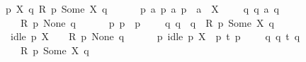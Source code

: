 \begin{isabellebody}
\isanewline
\ \ {\isacharparenleft}{\kern0pt}{\isasymforall}\ p\ X\ q{\isachardot}{\kern0pt}\ R\ p\ {\isacharparenleft}{\kern0pt}Some\ X{\isacharparenright}{\kern0pt}\ q\ {\isasymlongrightarrow}\isanewline
\ \ \ \ {\isacharparenleft}{\kern0pt}{\isasymforall}\ p{\isacharprime}{\kern0pt}\ a{\isachardot}{\kern0pt}\ p\ {\isasymlongmapsto}a\ p{\isacharprime}{\kern0pt}\ {\isasymand}\ a\ {\isasymin}\ X\ \ {\isasymlongrightarrow}\ \ {\isacharparenleft}{\kern0pt}{\isasymexists}\ q{\isacharprime}{\kern0pt}{\isachardot}{\kern0pt}\ {\isacharparenleft}{\kern0pt}q\ {\isasymlongmapsto}a\ q{\isacharprime}{\kern0pt}{\isacharparenright}{\kern0pt}\ {\isasymand}\ \isanewline
\ \ \ \ \ \ R\ p{\isacharprime}{\kern0pt}\ None\ q{\isacharprime}{\kern0pt}{\isacharparenright}{\kern0pt}{\isacharparenright}{\kern0pt}\ {\isasymand}\isanewline
\ \ \ \ {\isacharparenleft}{\kern0pt}{\isasymforall}\ p{\isacharprime}{\kern0pt}{\isachardot}{\kern0pt}\ p\ {\isasymlongmapsto}{\isasymtau}\ p{\isacharprime}{\kern0pt}\ \ {\isasymlongrightarrow}\ \ {\isacharparenleft}{\kern0pt}{\isasymexists}\ q{\isacharprime}{\kern0pt}{\isachardot}{\kern0pt}\ {\isacharparenleft}{\kern0pt}q\ {\isasymlongmapsto}{\isasymtau}\ q{\isacharprime}{\kern0pt}{\isacharparenright}{\kern0pt}\ {\isasymand}\ R\ p{\isacharprime}{\kern0pt}\ {\isacharparenleft}{\kern0pt}Some\ X{\isacharparenright}{\kern0pt}\ q{\isacharprime}{\kern0pt}{\isacharparenright}{\kern0pt}{\isacharparenright}{\kern0pt}\ {\isasymand}\isanewline
\ \ \ \ {\isacharparenleft}{\kern0pt}idle\ p\ X\ \ {\isasymlongrightarrow}\ \ R\ p\ None\ q{\isacharparenright}{\kern0pt}\ {\isasymand}\isanewline
\ \ \ \ {\isacharparenleft}{\kern0pt}{\isasymforall}\ p{\isacharprime}{\kern0pt}{\isachardot}{\kern0pt}\ idle\ p\ X\ {\isasymand}\ {\isacharparenleft}{\kern0pt}p\ {\isasymlongmapsto}t\ p{\isacharprime}{\kern0pt}{\isacharparenright}{\kern0pt}\ \ {\isasymlongrightarrow}\ \ {\isacharparenleft}{\kern0pt}{\isasymexists}\ q{\isacharprime}{\kern0pt}{\isachardot}{\kern0pt}\ q\ {\isasymlongmapsto}t\ q{\isacharprime}{\kern0pt}\ {\isasymand}\ \isanewline
\ \ \ \ \ \ R\ p{\isacharprime}{\kern0pt}\ {\isacharparenleft}{\kern0pt}Some\ X{\isacharparenright}{\kern0pt}\ q{\isacharprime}{\kern0pt}{\isacharparenright}{\kern0pt}{\isacharparenright}{\kern0pt}{\isacharparenright}{\kern0pt}{\isacartoucheclose}\isanewline
\isanewline
%
\isadelimunimportant
%
\endisadelimunimportant
%
\isatagunimportant
%
\endisatagunimportant
{\isafoldunimportant}%
%
\isadelimunimportant
%
\endisadelimunimportant
%
\isadelimdocument
%
\endisadelimdocument
%
\isatagdocument
%
\end{isabellebody}
